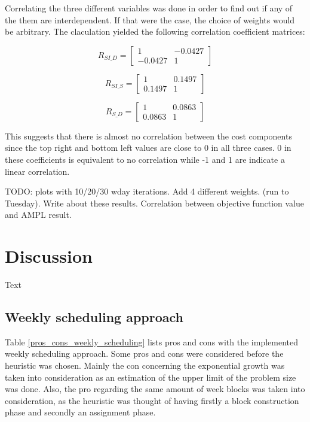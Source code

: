 Correlating the three different variables was done in order to find out if any of the them are interdependent. If that were the case, the choice of weights would be arbitrary. The claculation yielded the following correlation coefficient matrices:

\begin{equation}
  R_{SI\_D} =
  \begin{bmatrix}
 	 1  &  -0.0427 \\
 	 -0.0427  &  1
 \end{bmatrix}
\end{equation}

 \begin{equation}
 R_{SI\_S} =
 \begin{bmatrix}
	 1  &  0.1497 \\
	 0.1497  &  1
 \end{bmatrix}
 \end{equation}
 
\begin{equation}
 R_{S\_D} =
 \begin{bmatrix}
	 1  &  0.0863 \\
	 0.0863  &  1
 \end{bmatrix}
 \end{equation} 
 
 This suggests that there is almost no correlation between the cost components since the top right and bottom left values are close to 0 in all three cases. 0 in these coefficients is equivalent to no correlation while -1 and 1 are indicate a linear correlation. 
 
TODO: plots with 10/20/30 wday iterations. Add 4 different weights. (run to Tuesday).
Write about these results. Correlation between objective function value and AMPL result.

\section{Discussion}
Text


\subsection{Weekly scheduling approach}
Table \ref{pros_cons_weekly_scheduling} lists pros and cons with the implemented weekly scheduling approach. Some pros and cons were considered before the heuristic was chosen. Mainly the con concerning the exponential growth was taken into consideration as an estimation of the upper limit of the problem size was done. Also, the pro regarding the same amount of week blocks was taken into consideration, as the heuristic was thought of having firstly a block construction phase and secondly an assignment phase. 

